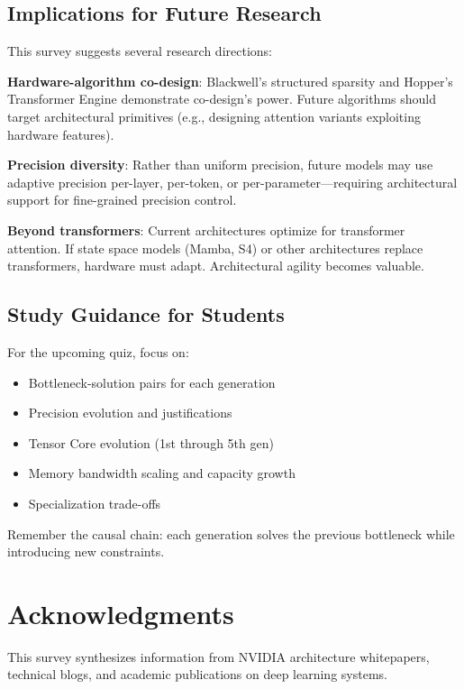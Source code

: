 \documentclass{article}
\begin{document}
\subsection{Implications for Future Research}

This survey suggests several research directions:

\textbf{Hardware-algorithm co-design}: Blackwell's structured sparsity and Hopper's Transformer Engine demonstrate co-design's power. Future algorithms should target architectural primitives (e.g., designing attention variants exploiting hardware features).

\textbf{Precision diversity}: Rather than uniform precision, future models may use adaptive precision per-layer, per-token, or per-parameter—requiring architectural support for fine-grained precision control.

\textbf{Beyond transformers}: Current architectures optimize for transformer attention. If state space models (Mamba, S4) or other architectures replace transformers, hardware must adapt. Architectural agility becomes valuable.

\subsection{Study Guidance for Students}

For the upcoming quiz, focus on:
\begin{itemize}
\item Bottleneck-solution pairs for each generation
\item Precision evolution and justifications
\item Tensor Core evolution (1st through 5th gen)
\item Memory bandwidth scaling and capacity growth
\item Specialization trade-offs
\end{itemize}

Remember the causal chain: each generation solves the previous bottleneck while introducing new constraints.

\section*{Acknowledgments}

This survey synthesizes information from NVIDIA architecture whitepapers, technical blogs, and academic publications on deep learning systems.



\end{document}
